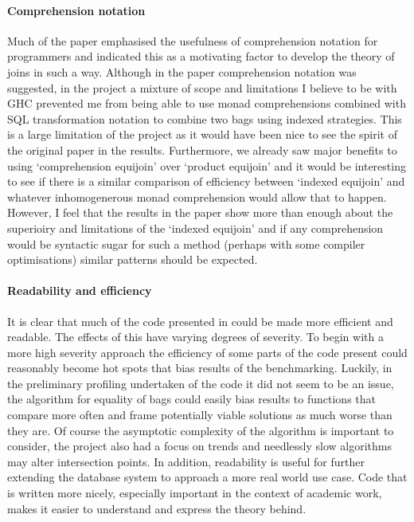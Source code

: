 \paragraph{Comprehension notation} Much of the paper \relalg{} emphasised the
usefulness of comprehension notation for programmers and indicated this as a
motivating factor to develop the theory of joins in such a way. Although in the
paper comprehension notation was suggested, in the project a mixture of scope
and limitations I believe to be with GHC prevented me from being able to use
monad comprehensions combined with SQL transformation notation to combine two
bags using indexed strategies. This is a large limitation of the project as it
would have been nice to see the spirit of the original paper in the results.
Furthermore, we already saw major benefits to using `comprehension equijoin'
over `product equijoin' and it would be interesting to see if there is a similar
comparison of efficiency between `indexed equijoin' and whatever inhomogenerous
monad comprehension would allow that to happen. However, I feel that the results
in the paper show more than enough about the superioiry and limitations of the
`indexed equijoin' and if any comprehension would be syntactic sugar for such a
method (perhaps with some compiler optimisations) similar patterns should be
expected.

\paragraph{Readability and efficiency} It is clear that much of the code
presented in  could be made more efficient and
readable. The effects of this have varying degrees of severity. To begin with a
more high severity approach the efficiency of some parts of the code present
could reasonably become hot spots that bias results of the benchmarking.
Luckily, in the preliminary profiling undertaken of the code it did not seem to
be an issue, the algorithm for equality of bags could easily bias results to
functions that compare more often and frame potentially viable solutions as much
worse than they are. Of course the asymptotic complexity of the algorithm is
important to consider, the project also had a focus on trends and needlessly
slow algorithms may alter intersection points. In addition, readability is useful for further extending the
database system to approach a more real world use case. Code that
is written more nicely, especially important in the context of academic work,
makes it easier to understand and express the theory behind.
